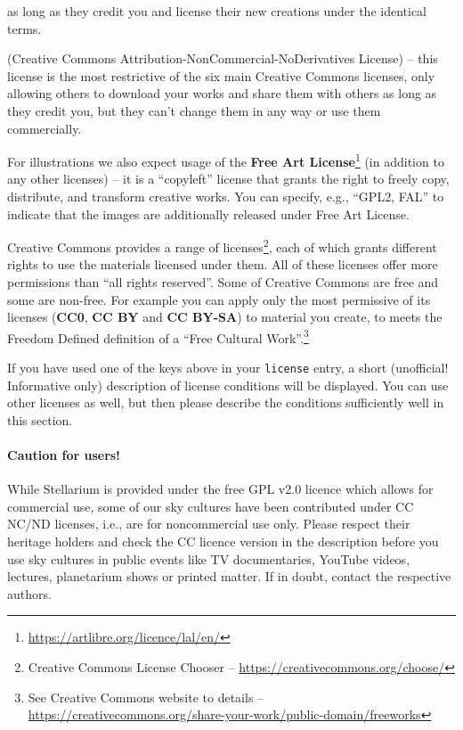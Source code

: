\begin{description}
    as long as they credit you and license their new creations under the identical terms.
  \item[CC BY-NC-ND] (Creative Commons Attribution-NonCommercial-NoDerivatives License) -- this license is the most restrictive of the six main Creative Commons licenses, 
    only allowing others to download your works and share them with others as long as they credit you, but they can’t change them in any way or use them commercially.
  \item[FAL] For illustrations we also expect usage of the \textbf{Free Art License}\footnote{\url{https://artlibre.org/licence/lal/en/}} (in addition to any other licenses) --
    it is a ``copyleft'' license that grants the right to freely copy, distribute, and transform creative works. You can specify, e.g., ``GPL2, FAL'' to 
	indicate that the images are additionally released under Free Art License.
\end{description}

\noindent Creative Commons provides a range of licenses\footnote{Creative
  Commons License Chooser --
  \url{https://creativecommons.org/choose/}}, each of which grants
different rights to use the materials licensed under them. All of
these licenses offer more permissions than ``all rights
reserved''. Some of Creative Commons are free and some are
non-free. For example you can apply only the most permissive of its
licenses (\textbf{CC0}, \textbf{CC BY} and \textbf{CC BY-SA}) to
material you create, to meets the Freedom Defined definition of a
``Free Cultural Work''.\footnote{See Creative Commons website to
  details --
  \url{https://creativecommons.org/share-your-work/public-domain/freeworks}}

If you have used one of the keys above in your \texttt{license} entry,
a short (unofficial!  Informative only) description of license
conditions will be displayed. You can use other licenses as well, but
then please describe the conditions sufficiently well in this section.


\paragraph{Caution for users!} While Stellarium is provided under the free GPL v2.0 licence which allows for commercial use,
some of our sky cultures have been contributed under CC NC/ND licenses,
i.e., are for noncommercial use only.  Please respect their heritage
holders and check the CC licence version in the description before
you use sky cultures in public events like TV documentaries, YouTube
videos, lectures, planetarium shows or printed matter. If in doubt,
contact the respective authors.


